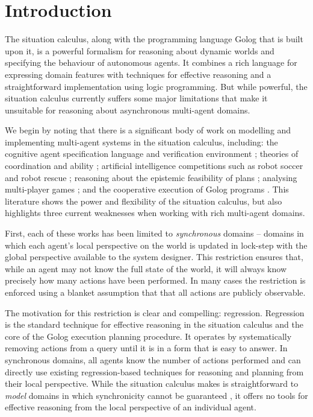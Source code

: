 

\chapter{Introduction}

\label{ch:intro}

The situation calculus, along with the programming language Golog
that is built upon it, is a powerful formalism for reasoning about
dynamic worlds and specifying the behaviour of autonomous agents.
It combines a rich language for expressing domain features with techniques
for effective reasoning and a straightforward implementation using
logic programming. But while powerful, the situation calculus currently
suffers some major limitations that make it unsuitable for reasoning
about asynchronous multi-agent domains.

We begin by noting that there is a significant body of work on modelling
and implementing multi-agent systems in the situation calculus, including:
the cognitive agent specification language and verification environment
\citep{shapiro02casl}; theories of coordination and ability \citep{ghaderi07sc_joint_ability};
artificial intelligence competitions such as robot soccer \citep{Ferrein2005readylog}
and robot rescue \citep{farinelli07team_golog}; reasoning about the
epistemic feasibility of plans \citep{Lesperance01epi_feas_casl};
analysing multi-player games \citep{delgrande01sitcalc_cleudo}; and
the cooperative execution of Golog programs \citep{Ferrein2005readylog,kelly06hlp_dps}.
This literature shows the power and flexibility of the situation calculus,
but also highlights three current weaknesses when working with rich
multi-agent domains.

First, each of these works has been limited to \emph{synchronous}
domains -- domains in which each agent's local perspective on the
world is updated in lock-step with the global perspective available
to the system designer. This restriction ensures that, while an agent
may not know the full state of the world, it will always know precisely
how many actions have been performed. In many cases the restriction
is enforced using a blanket assumption that that all actions are publicly
observable.

The motivation for this restriction is clear and compelling: regression.
Regression is the standard technique for effective reasoning in the
situation calculus and the core of the Golog execution planning procedure.
It operates by systematically removing actions from a query until
it is in a form that is easy to answer. In synchronous domains, all
agents know the number of actions performed and can directly use existing
regression-based techniques for reasoning and planning from their
local perspective. While the situation calculus makes is straightforward
to \emph{model} domains in which synchronicity cannot be guaranteed
\citep{Lesperance99sitcalc_approach}, it offers no tools for effective
reasoning from the local perspective of an individual agent.

